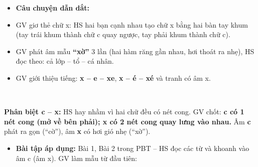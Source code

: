 \documentclass[../main.tex]{subfiles}
\begin{document}
\begin{itemize}
    \item \textbf{Câu chuyện dẫn dắt:} 
    \item GV giơ thẻ chữ x:  HS hai bạn cạnh nhau tạo chữ x bằng hai bàn tay khum (tay trái khum thành chữ c quay ngược, tay phải khum thành chữ c).
    \item GV phát âm mẫu \textbf{“xờ”} 3 lần (hai hàm răng gần nhau, hơi thoát ra nhẹ), HS đọc theo: cả lớp -- tổ -- cá nhân.
    \item GV giới thiệu tiếng: \textbf{x -- e -- xe}, \textbf{x -- é -- xé} và tranh có âm x.
\end{itemize}
\GAhinh
{\centering{}\par}
\vspace{4pt}
{\centering
    \hfill
    \begin{minipage}[b]{0.36\linewidth}\centering{}\\[6pt]\end{minipage}\par}
\begin{luuy}
    \textbf{Phân biệt c -- x:} HS hay nhầm vì hai chữ đều có nét cong. GV chốt: \textbf{c có 1 nét cong (mở về bên phải); x có 2 nét cong quay lưng vào nhau.} Âm \textbf{c} phát ra gọn (“cờ”), âm \textbf{x} có hơi gió nhẹ (“xờ”).
\end{luuy}
\begin{itemize}
    \item \textbf{Bài tập áp dụng:} Bài 1, Bài 2 trong PBT -- HS đọc các từ và khoanh vào âm c (âm x). GV làm mẫu từ đầu tiên: 
\end{itemize}

\end{document}
